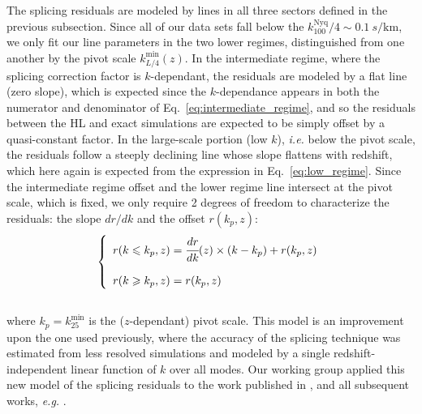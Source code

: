 The splicing residuals are modeled by lines in all three sectors defined in the previous subsection. Since all of our data sets fall below the $k_{100}^{\mathrm{Nyq}}/4 \sim 0.1~s/\mathrm{km}$, we only fit our line parameters in the two lower regimes, distinguished from one another by the pivot scale $k_{L/4}^{\mathrm{min}}(z)$. In the intermediate regime, where the splicing correction factor is $k$-dependant, the residuals are modeled by a flat line (zero slope), which is expected since the $k$-dependance appears in both the numerator and denominator of Eq.~\ref{eq:intermediate_regime}, and so the residuals between the HL and exact simulations are expected to be simply offset by a quasi-constant factor. In the large-scale portion (low $k$), \textit{i.e.} below the pivot scale, the residuals follow a steeply declining line whose slope flattens with redshift, which here again is expected from the expression in Eq.~\ref{eq:low_regime}. Since the intermediate regime offset and the lower regime line intersect at the pivot scale, which is fixed, we only require 2 degrees of freedom to characterize the residuals: the slope $dr/dk$ and the offset $r(k_p, z)$: \\
\begin{equation}
\label{eq:splicing_dof}
\left\{
\begin{array}{l}
r(k \leqslant k_p, z) = \cfrac{d r}{d k} (z) \times (k-k_p) + r(k_p, z) \\
\\
r(k \geqslant k_p, z) = r(k_p, z)
\end{array}
\right.
\end{equation} \\ where $k_p = k_{25}^{\mathrm{min}}$ is the ($z$-dependant) pivot scale. This model is an improvement upon the one used previously, where the accuracy of the splicing technique was estimated from less resolved simulations and modeled by a single redshift-independent linear function of $k$ over all modes. Our working group applied this new model of the splicing residuals to the work published in \cite{Palanque2015b}, and all subsequent works, \textit{e.g.} \cite{Baur16, Yeche17, Armengaud_FDM, Baur17}.




